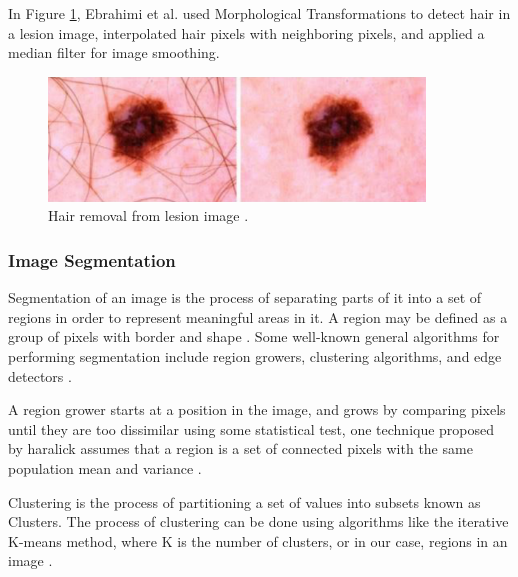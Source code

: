 \documentclass[12pt]{diazessay}
\begin{document}
    In Figure \ref{fig:Morph}, Ebrahimi et al. \cite{Seyyed_Ebrahimi2010-xg} used Morphological Transformations to detect hair in a lesion image, interpolated hair pixels with neighboring pixels, and applied a median filter for image smoothing.
    \begin{figure}[H]
        \centering
        \includegraphics[width=10cm]{Figures/Hair-removal.png}
        \caption[Hair removal from lesion image]{Hair removal from lesion image \cite{Seyyed_Ebrahimi2010-xg}.}
        \label{fig:Morph}
    \end{figure}
    
     \subsubsection{Image Segmentation}
    \label{section: Image segmentation}
    \hspace{0.7cm} Segmentation of an image is the process of separating parts of it into a set of regions in order to represent meaningful areas in it. A region may be defined as a group of pixels with border and shape \cite{Stockman2001-vr}. Some well-known general algorithms for performing segmentation include region growers, clustering algorithms, and edge detectors \cite{Stockman2001-vr}.
    
    A region grower starts at a position in the image, and grows by comparing pixels until they are too dissimilar using some statistical test, one technique proposed by haralick assumes that a region is a set of connected pixels with the same population mean and variance \cite{Stockman2001-vr}.
    
    Clustering is the process of partitioning a set of values into subsets known as Clusters. The process of clustering can be done using algorithms like the iterative K-means method, where K is the number of clusters, or in our case, regions in an image \cite{Stockman2001-vr}.
    
\end{document}
